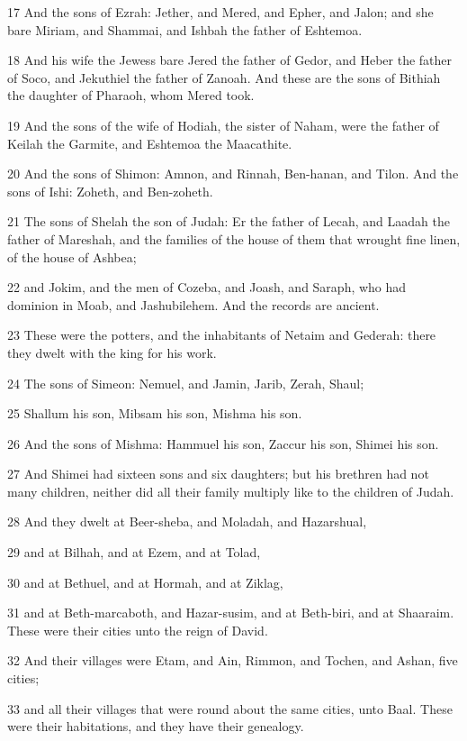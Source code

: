 \par 17 And the sons of Ezrah: Jether, and Mered, and Epher, and Jalon; and she bare Miriam, and Shammai, and Ishbah the father of Eshtemoa.
\par 18 And his wife the Jewess bare Jered the father of Gedor, and Heber the father of Soco, and Jekuthiel the father of Zanoah. And these are the sons of Bithiah the daughter of Pharaoh, whom Mered took.
\par 19 And the sons of the wife of Hodiah, the sister of Naham, were the father of Keilah the Garmite, and Eshtemoa the Maacathite.
\par 20 And the sons of Shimon: Amnon, and Rinnah, Ben-hanan, and Tilon. And the sons of Ishi: Zoheth, and Ben-zoheth.
\par 21 The sons of Shelah the son of Judah: Er the father of Lecah, and Laadah the father of Mareshah, and the families of the house of them that wrought fine linen, of the house of Ashbea;
\par 22 and Jokim, and the men of Cozeba, and Joash, and Saraph, who had dominion in Moab, and Jashubilehem. And the records are ancient.
\par 23 These were the potters, and the inhabitants of Netaim and Gederah: there they dwelt with the king for his work.
\par 24 The sons of Simeon: Nemuel, and Jamin, Jarib, Zerah, Shaul;
\par 25 Shallum his son, Mibsam his son, Mishma his son.
\par 26 And the sons of Mishma: Hammuel his son, Zaccur his son, Shimei his son.
\par 27 And Shimei had sixteen sons and six daughters; but his brethren had not many children, neither did all their family multiply like to the children of Judah.
\par 28 And they dwelt at Beer-sheba, and Moladah, and Hazarshual,
\par 29 and at Bilhah, and at Ezem, and at Tolad,
\par 30 and at Bethuel, and at Hormah, and at Ziklag,
\par 31 and at Beth-marcaboth, and Hazar-susim, and at Beth-biri, and at Shaaraim. These were their cities unto the reign of David.
\par 32 And their villages were Etam, and Ain, Rimmon, and Tochen, and Ashan, five cities;
\par 33 and all their villages that were round about the same cities, unto Baal. These were their habitations, and they have their genealogy.
